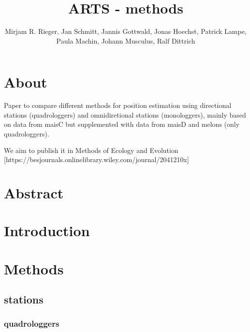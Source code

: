\documentclass[
  letterpaper,
  DIV=11,
  numbers=noendperiod]{scrartcl}
\title{ARTS - methods}
\author{Mirjam R. Rieger, Jan Schmitt, Jannis Gottwald, Jonas Hoechst,
Patrick Lampe, Paula Machin, Johann Musculus, Ralf Dittrich}
\date{}
\begin{document}
\maketitle
\ifdefined\Shaded\renewenvironment{Shaded}{\begin{tcolorbox}[boxrule=0pt, sharp corners, breakable, enhanced, frame hidden, interior hidden, borderline west={3pt}{0pt}{shadecolor}]}{\end{tcolorbox}}\fi

\hypertarget{about}{%
\section*{About}\label{about}}

Paper to compare different methods for position estimation using
directional stations (quadrologgers) and omnidiretional stations
(monologgers), mainly based on data from maisC but supplemented with
data from maisD and melons (only quadrologgers).

We aim to publish it in Methods of Ecology and Evolution
{[}https://besjournals.onlinelibrary.wiley.com/journal/2041210x{]}

\hypertarget{abstract}{%
\section*{Abstract}\label{abstract}}

\hypertarget{introduction}{%
\section{Introduction}\label{introduction}}

\hypertarget{methods}{%
\section{Methods}\label{methods}}

\hypertarget{stations}{%
\subsection{stations}\label{stations}}

\hypertarget{quadrologgers}{%
\subsubsection{quadrologgers}\label{quadrologgers}}
\end{document}
